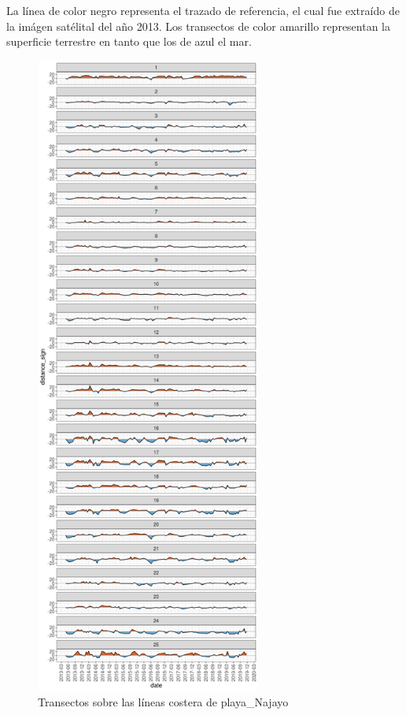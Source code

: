 \documentclass[11pt,]{article}
\begin{document}
La línea de color negro representa el trazado de referencia, el cual fue
extraído de la imágen satélital del año 2013. Los transectos de color
amarillo representan la superficie terrestre en tanto que los de azul el
mar.

\begin{figure}
\centering
\includegraphics[height=8.33333in]{cambio_playa_Najayo.png}
\caption{Transectos sobre las líneas costera de
playa\_Najayo\label{cambio}}
\end{figure}
\end{document}
